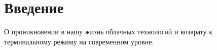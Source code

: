 \chapter*{Введение}

О проникновении в нашу жизнь облачных технологий и возврату к терминальному режиму на современном уровне.
